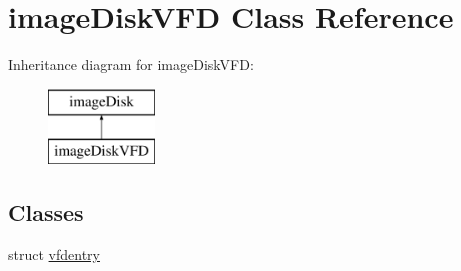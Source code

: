 \hypertarget{classimageDiskVFD}{\section{image\-Disk\-V\-F\-D Class Reference}
\label{classimageDiskVFD}
}
Inheritance diagram for image\-Disk\-V\-F\-D\-:\begin{figure}[H]
\begin{center}
\leavevmode
\includegraphics[height=2.000000cm]{classimageDiskVFD}
\end{center}
\end{figure}
\subsection*{Classes}
\begin{DoxyCompactItemize}
\item 
struct \hyperlink{structimageDiskVFD_1_1vfdentry}{vfdentry}
\end{DoxyCompactItemize}

